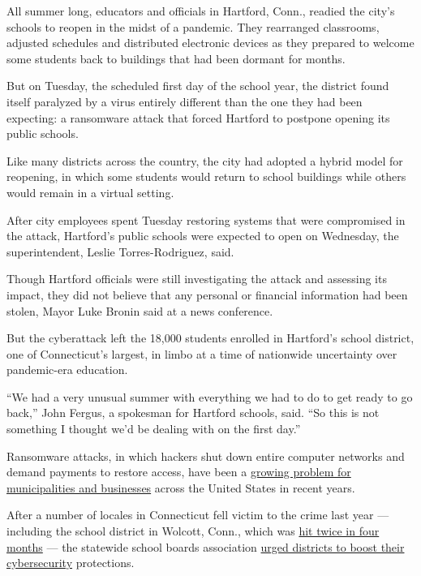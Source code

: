 All summer long, educators and officials in Hartford, Conn., readied the
city's schools to reopen in the midst of a pandemic. They rearranged
classrooms, adjusted schedules and distributed electronic devices as
they prepared to welcome some students back to buildings that had been
dormant for months.

But on Tuesday, the scheduled first day of the school year, the district
found itself paralyzed by a virus entirely different than the one they
had been expecting: a ransomware attack that forced Hartford to postpone
opening its public schools.

Like many districts across the country, the city had adopted a hybrid
model for reopening, in which some students would return to school
buildings while others would remain in a virtual setting.

After city employees spent Tuesday restoring systems that were
compromised in the attack, Hartford's public schools were expected to
open on Wednesday, the superintendent, Leslie Torres-Rodriguez, said.

Though Hartford officials were still investigating the attack and
assessing its impact, they did not believe that any personal or
financial information had been stolen, Mayor Luke Bronin said at a news
conference.

But the cyberattack left the 18,000 students enrolled in Hartford's
school district, one of Connecticut's largest, in limbo at a time of
nationwide uncertainty over pandemic-era education.

``We had a very unusual summer with everything we had to do to get ready
to go back,'' John Fergus, a spokesman for Hartford schools, said. ``So
this is not something I thought we'd be dealing with on the first day.''

Ransomware attacks, in which hackers shut down entire computer networks
and demand payments to restore access, have been a
\href{https://www.nytimes3xbfgragh.onion/2020/02/09/technology/ransomware-attacks.html?module=inline}{growing
problem for municipalities and businesses} across the United States in
recent years.

After a number of locales in Connecticut fell victim to the crime last
year --- including the school district in Wolcott, Conn., which was
\href{https://www.usnews.com/news/best-states/connecticut/articles/2019-09-10/ransomware-attack-hits-school-district-twice-in-4-months}{hit
twice in four months} --- the statewide school boards association
\href{https://www.courant.com/news/connecticut/hc-news-cyber-attacks-schools-towns-ransom-20190831-jrkimu7h2fbvneiiungecspq3y-story.html}{urged
districts to boost their cybersecurity} protections.


